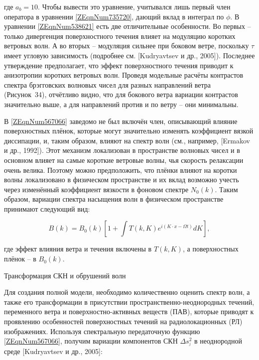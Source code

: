где $a_{b} =10$. Чтобы вывести это уравнение, учитывался лишь первый член оператора в уравнении \eqref{ZEqnNum735720}, дающий вклад в интеграл по $\phi $. В уравнении \eqref{ZEqnNum538621} есть две отличительные особенности. Во первых -- только дивергенция поверхностного течения влияет на модуляцию коротких ветровых волн. А во вторых -- модуляция сильнее при боковом ветре, поскольку $\tau $ имеет угловую зависимость (подробнее см. [Kudryavtsev и др., 2005]). Последнее утверждение предполагает, что эффект поверхностного течения приводит к анизотропии коротких ветровых волн. Проведя модельные расчёты контрастов спектра брэгговских волновых чисел для разных направлений ветра (Рисунок~34), отчётливо видно, что для бокового ветра вариации контрастов значительно выше, а для направлений против и по ветру -- они минимальны. 

В \eqref{ZEqnNum567066} заведомо не был включён член, описывающий влияние поверхностных плёнок, которые могут значительно изменять коэффициент вязкой диссипации, и, таким образом, влияют на спектр волн (см., например, [Ermakov и др., 1992]). Этот механизм локализован в пространстве волновых чисел и в основном влияет на самые короткие ветровые волны, чья скорость релаксации очень велика. Поэтому можно предположить, что плёнки влияют на коротки волны локализовано в физическом пространстве и их вклад возможно учесть через изменённый коэффициент вязкости в фоновом спектре $N_{0} \left(k\right)$. Таким образом, вариации спектра насыщения волн в физическом пространстве принимают следующий вид:



\begin{equation} \label{1.43)} B\left(k\right)=B_{0} \left(k\right)\left[1+\int T(k,K)e^{i\left(K\cdot x-\Omega t\right)} dK \right],  \end{equation} 



где эффект влияния ветра и течения включены в $T(k,K)$, а поверхностных плёнок -- в $B_{0} \left(k\right)$.



Трансформация СКН и обрушений волн

Для создания полной модели, необходимо количественно оценить спектр волн, а также его трансформации в присутствии пространственно-неоднородных течений, переменного ветра и поверхностно-активных веществ (ПАВ), которые приводят к проявлению особенностей поверхностных течений на радиолокационных (РЛ) изображениях. Используя спектральную передаточную функцию \eqref{ZEqnNum567066}, получим вариации компонентов СКН $\Delta s_{^{j} }^{2} $ в неоднородной среде [Kudryavtsev и др., 2005]:



